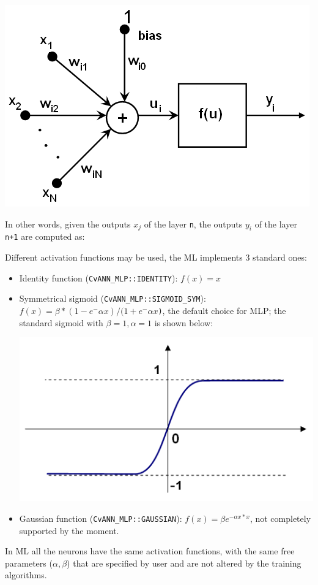 \includegraphics{pics/neuron_model.png}

In other words, given the outputs \texttt{{$x_j$}} of the layer \texttt{n}, the outputs \texttt{{$y_i$}} of the layer \texttt{n+1} are computed as:


Different activation functions may be used, the ML implements 3 standard ones:
\begin{itemize}
\item{Identity function (\texttt{CvANN\_MLP::IDENTITY}): \texttt{$f(x)=x$}}
\item{Symmetrical sigmoid (\texttt{CvANN\_MLP::SIGMOID\_SYM}): \texttt{$f(x)=\beta*(1-e^-\alpha x)/(1+e^-\alpha x$)}, the default choice for MLP; the standard sigmoid with $\beta =1, \alpha =1$ is shown below:}

\includegraphics{pics/sigmoid_bipolar.png} 

\item{Gaussian function (\texttt{CvANN\_MLP::GAUSSIAN}): \texttt{$f(x)=\beta e^{-\alpha x*x}$}, not completely supported by the moment.}
\end{itemize}
In ML all the neurons have the same activation functions, with the same free parameters ($\alpha, \beta$) that are specified by user and are not altered by the training algorithms.

